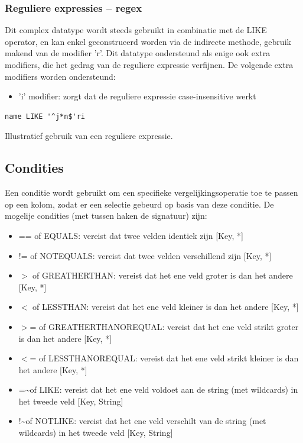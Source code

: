 \subsubsection{Reguliere expressies -- regex}

Dit complex datatype wordt steeds gebruikt in combinatie met de LIKE operator, en kan enkel geconstrueerd worden via de indirecte methode, gebruik makend van de modifier 'r'. Dit datatype ondersteund als enige ook extra modifiers, die het gedrag van de reguliere expressie verfijnen. De volgende extra modifiers worden ondersteund:
\begin{itemize}
\item 'i' modifier: zorgt dat de reguliere expressie case-insensitive werkt
\end{itemize}

\begin{code}
\begin{verbatim}
name LIKE '^j*n$'ri
\end{verbatim}
\caption{Illustratief gebruik van een reguliere expressie.}
\end{code}

\subsection{Condities}

Een conditie wordt gebruikt om een specifieke vergelijkingsoperatie toe te passen op een kolom, zodat er een selectie gebeurd op basis van deze conditie. De mogelije condities (met tussen haken de signatuur) zijn:

\begin{itemize}
\item == of EQUALS: vereist dat twee velden identiek zijn [Key, *]
\item != of NOTEQUALS: vereist dat twee velden verschillend zijn [Key, *]
\item $>$ of GREATHERTHAN: vereist dat het ene veld groter is dan het andere [Key, *]
\item $<$ of LESSTHAN: vereist dat het ene veld kleiner is dan het andere [Key, *]
\item $>$= of GREATHERTHANOREQUAL: vereist dat het ene veld strikt groter is dan het andere [Key, *]
\item $<$= of LESSTHANOREQUAL: vereist dat het ene veld strikt kleiner is dan het andere [Key, *]
\item =\textasciitilde of LIKE: vereist dat het ene veld voldoet aan de string (met wildcards) in het tweede veld [Key, String]
\item !\textasciitilde of NOTLIKE: vereist dat het ene veld verschilt van de string (met wildcards) in het tweede veld [Key, String]
\end{itemize}


